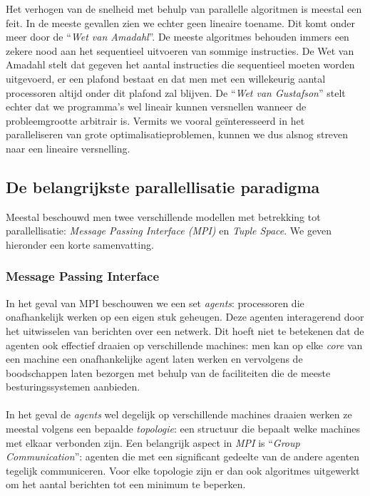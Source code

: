 Het verhogen van de snelheid met behulp van parallelle algoritmen is meestal een feit. In de meeste gevallen zien we echter geen lineaire toename. Dit komt onder meer door de ``\emph{Wet van Amadahl}''\cite{Amdahl:1967:VSP:1465482.1465560}. De meeste algoritmes behouden immers een zekere nood aan het sequentieel uitvoeren van sommige instructies. De Wet van Amadahl stelt dat gegeven het aantal instructies die sequentieel moeten worden uitgevoerd, er een plafond bestaat en dat men met een willekeurig aantal processoren altijd onder dit plafond zal blijven. De ``\emph{Wet van Gustafson}''\cite{Gustafson:1988:RAL:42411.42415} stelt echter dat we programma's wel lineair kunnen versnellen wanneer de probleemgrootte arbitrair is. Vermits we vooral ge\"interesseerd in het paralleliseren van grote optimalisatieproblemen, kunnen we dus alsnog streven naar een lineaire versnelling.

\subsection{De belangrijkste parallellisatie paradigma}

Meestal beschouwd men twee verschillende modellen met betrekking tot parallellisatie: \emph{Message Passing Interface (MPI)} en \emph{Tuple Space}. We geven hieronder een korte samenvatting.
\subsubsection{Message Passing Interface}

In het geval van MPI beschouwen we een set \emph{agents}: processoren die onafhankelijk werken op een eigen stuk geheugen. Deze agenten interagerend door het uitwisselen van berichten over een netwerk. Dit hoeft niet te betekenen dat de agenten ook effectief draaien op verschillende machines: men kan op elke \emph{core} van een machine een onafhankelijke agent laten werken en vervolgens de boodschappen laten bezorgen met behulp van de faciliteiten die de meeste besturingssystemen aanbieden.

\paragraph{}

In het geval de \emph{agents} wel degelijk op verschillende machines draaien werken ze meestal volgens een bepaalde \emph{topologie}: een structuur die bepaalt welke machines met elkaar verbonden zijn. Een belangrijk aspect in \emph{MPI} is ``\emph{Group Communication}'': agenten die met een significant gedeelte van de andere agenten tegelijk communiceren. Voor elke topologie zijn er dan ook algoritmes uitgewerkt om het aantal berichten tot een minimum te beperken.

